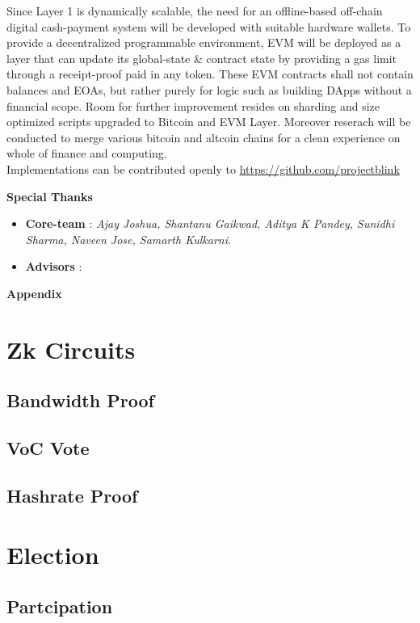 \documentclass[a4paper,10pt]{article}
\begin{document}
Since Layer 1 is dynamically scalable, the need for an offline-based off-chain digital cash-payment system will be developed with suitable hardware wallets. To provide a decentralized programmable environment, EVM will be deployed as a layer that can update its global-state \& contract state by providing a gas limit through a receipt-proof paid in any token. These EVM contracts shall not contain balances and EOAs, but rather purely for logic such as building DApps without a financial scope. Room for further improvement resides on sharding and size optimized scripts upgraded to Bitcoin and EVM Layer. Moreover reserach will be conducted to merge various bitcoin and altcoin chains for a clean experience on whole of finance and computing.\\

\noindent Implementations can be contributed openly to \url{https://github.com/projectblink}
\nocite{nakamoto2008bitcoin} \nocite{poon2016bitcoin}  \nocite{yakovenko2018solana} \nocite{wood2014ethereum}



\noindent \textbf{Special Thanks}
\begin{itemize}
\item \textbf{Core-team} : \textit{Ajay Joshua, Shantanu Gaikwad, Aditya K Pandey, Sunidhi Sharma, Naveen Jose, Samarth Kulkarni}. 
\item \textbf{Advisors} : 
\end{itemize}

\newpage
\appendix
\noindent \Large \textbf{Appendix}
\normalsize
\section{Zk Circuits}
\subsection{Bandwidth Proof}
\subsection{VoC Vote}
\subsection{Hashrate Proof}
\section{Election}

\subsection{Partcipation}
\end{document}
